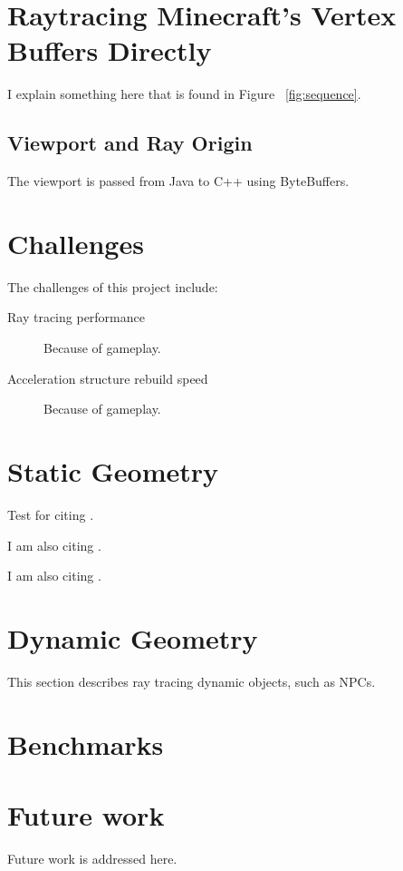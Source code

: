 \documentclass[]{article}
\begin{document}
\section{Raytracing Minecraft's Vertex Buffers Directly}

I explain something here that is found in Figure ~\ref{fig:sequence}.
\subsection{Viewport and Ray Origin}
The viewport is passed from Java to C++ using ByteBuffers.

\section{Challenges}
The challenges of this project include:
\begin{description}
  \item [Ray tracing performance] Because of gameplay.
  \item [Acceleration structure rebuild speed] Because of gameplay.
\end{description}

\section{Static Geometry}
Test for citing \cite{amanatides1987fast}.

I am also citing \cite{ivson2009gpu}.

I am also citing \cite{reinhard2000dynamic}.

\section{Dynamic Geometry}
This section describes ray tracing dynamic objects, such as NPCs.

\section{Benchmarks}


\section{Future work}
Future work is addressed here.

{}

%

\listoffigures
\end{document}

